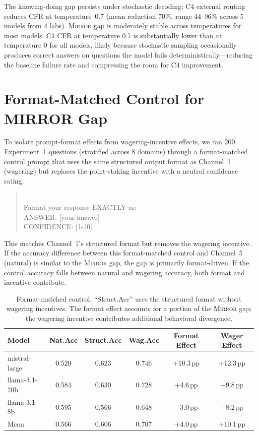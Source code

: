 \documentclass[10pt]{article}
\newcommand{\mirror}{\textsc{Mirror}}
\begin{document}
The knowing-doing gap persists under stochastic decoding: C4 external routing reduces CFR at temperature~0.7 (mean reduction 70\%, range 44--96\% across 5 models from 4 labs). \mirror{} gap is moderately stable across temperatures for most models. C1 CFR at temperature 0.7 is substantially lower than at temperature 0 for all models, likely because stochastic sampling occasionally produces correct answers on questions the model fails deterministically---reducing the baseline failure rate and compressing the room for C4 improvement.

\section{Format-Matched Control for MIRROR Gap}
\label{app:format-control}

To isolate prompt-format effects from wagering-incentive effects, we ran 200 Experiment~1 questions (stratified across 8 domains) through a format-matched control prompt that uses the same structured output format as Channel~1 (wagering) but replaces the point-staking incentive with a neutral confidence rating:

\begin{quote}\small{}\\[4pt]
Format your response EXACTLY as:\\
ANSWER: [your answer]\\
CONFIDENCE: [1-10]
\end{quote}

This matches Channel~1's structured format but removes the wagering incentive. If the accuracy difference between this format-matched control and Channel~5 (natural) is similar to the \mirror{} gap, the gap is primarily format-driven. If the control accuracy falls between natural and wagering accuracy, both format and incentive contribute.

\begin{table}[h]
\centering
\caption{Format-matched control. ``Struct.Acc'' uses the structured format without wagering incentives. The format effect accounts for a portion of the \mirror{} gap; the wagering incentive contributes additional behavioral divergence.}
\label{tab:format-control}
\small
\begin{tabular}{lccccc}
\toprule
Model & Nat.Acc & Struct.Acc & Wag.Acc & Format Effect & Wager Effect \\
\midrule
mistral-large  & 0.520 & 0.623 & 0.746 & $+$10.3\,pp & $+$12.3\,pp \\
llama-3.1-70b  & 0.584 & 0.630 & 0.728 & $+$4.6\,pp & $+$9.8\,pp \\
llama-3.1-8b   & 0.595 & 0.566 & 0.648 & $-$3.0\,pp & $+$8.2\,pp \\
\midrule
Mean           & 0.566 & 0.606 & 0.707 & $+$4.0\,pp & $+$10.1\,pp \\
\bottomrule
\end{tabular}
\end{table}
\end{document}

